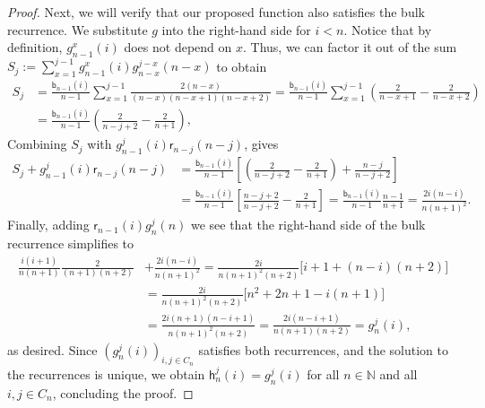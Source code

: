 \documentclass[10pt,a4paper]{amsart}
\newcommand{\N}{\mathbb{N}}
\newcommand{\sgrboth}[2]{\mathsf{b}_{#1}(#2)}
\newcommand{\sgrright}[2]{\mathsf{r}_{#1}(#2)}
\begin{document}
\begin{proof}
    Next, we will verify that our proposed function also satisfies the bulk recurrence. We substitute $g$ into the right-hand side for $i < n$. Notice that by definition, $g_{n-1}^x(i)$ does not depend on $x$. Thus, we can factor it out of the sum $S_j := \sum_{x=1}^{j-1} g_{n-1}^x(i)g_{n-x}^{j-x}(n-x)$ to obtain
    \begin{align*}
        S_j &= \frac{\sgrboth{n-1}{i}}{n-1} \sum_{x=1}^{j-1} \frac{2(n-x)}{(n-x)(n-x+1)(n-x+2)} = \frac{\sgrboth{n-1}{i}}{n-1} \sum_{x=1}^{j-1} \left( \frac{2}{n-x+1} - \frac{2}{n-x+2} \right) \\&= \frac{\sgrboth{n-1}{i}}{n-1} \left( \frac{2}{n-j+2} - \frac{2}{n+1} \right),
    \end{align*}
    Combining $S_j$ with $g_{n-1}^j(i)\sgrright{n-j}{n-j}$, gives
    \begin{align*}
        S_j + g_{n-1}^j(i)\sgrright{n-j}{n-j} &= \frac{\sgrboth{n-1}{i}}{n-1} \left[ \left( \frac{2}{n-j+2} - \frac{2}{n+1} \right) + \frac{n-j}{n-j+2} \right] \\
        &= \frac{\sgrboth{n-1}{i}}{n-1} \left[ \frac{n-j+2}{n-j+2} - \frac{2}{n+1} \right] = \frac{\sgrboth{n-1}{i}}{n-1} \frac{n-1}{n+1} = \frac{2i(n-i)}{n(n+1)^2}.
    \end{align*}
    Finally, adding $\sgrright{n-1}{i}g_n^j(n)$ we see that the right-hand side of the bulk recurrence simplifies to
    \begin{align*}
        \frac{i(i+1)}{n(n+1)}   \frac{2}{(n+1)(n+2)}  &+ \frac{2i(n-i)}{n(n+1)^2}
        = \frac{2i}{n(n+1)^2(n+2)} \Big[ i + 1 + (n-i)(n+2) \Big] \\
        &= \frac{2i}{n(n+1)^2(n+2)} \Big[ n^2 + 2n + 1 - i(n+1) \Big] \\
        &= \frac{2i(n+1)(n-i+1)}{n(n+1)^2(n+2)} = \frac{2i(n-i+1)}{n(n+1)(n+2)} = g_n^j(i),
    \end{align*}
    as desired.
    Since $(g_n^j(i))_{i,j\in C_n}$ satisfies both recurrences, and the solution to the recurrences is unique, we obtain $\mathsf{h}_n^j(i) = g_n^j(i)$ for all $n\in\N$ and all $i,j\in C_n$, concluding the proof.
\end{proof}
\end{document}
